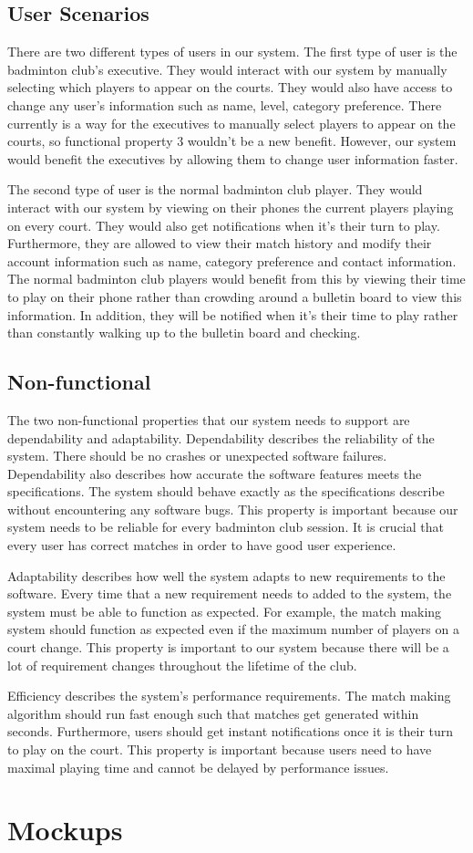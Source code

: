 \documentclass{article}
\begin{document}
\subsection{User Scenarios}
There are two different types of users in our system. The first type of user is the badminton club's executive. They would interact with our system by manually selecting which players to appear on the courts. They would also have access to change any user's information such as name, level, category preference. There currently is a way for the executives to manually select players to appear on the courts, so functional property 3 wouldn't be a new benefit. However, our system would benefit the executives by allowing them to change user information faster.

The second type of user is the normal badminton club player. They would interact with our system by viewing on their phones the current players playing on every court. They would also get notifications when it's their turn to play. Furthermore, they are allowed to view their match history and modify their account information such as name, category preference and contact information. The normal badminton club players would benefit from this by viewing their time to play on their phone rather than crowding around a bulletin board to view this information. In addition, they will be notified when it's their time to play rather than constantly walking up to the bulletin board and checking.

\subsection{Non-functional}
The two non-functional properties that our system needs to support are dependability and adaptability. Dependability describes the reliability of the system. There should be no crashes or unexpected software failures. Dependability also describes how accurate the software features meets the specifications. The system should behave exactly as the specifications describe without encountering any software bugs. This property is important because our system needs to be reliable for every badminton club session. It is crucial that every user has correct matches in order to have good user experience.

Adaptability describes how well the system adapts to new requirements to the software. Every time that a new requirement needs to added to the system, the system must be able to function as expected. For example, the match making system should function as expected even if the maximum number of players on a court change. This property is important to our system because there will be a lot of requirement changes throughout the lifetime of the club.

Efficiency describes the system's performance requirements. The match making algorithm should run fast enough such that matches get generated within seconds. Furthermore, users should get instant notifications once it is their turn to play on the court. This property is important because users need to have maximal playing time and cannot be delayed by performance issues.
\section{Mockups}
\end{document}
